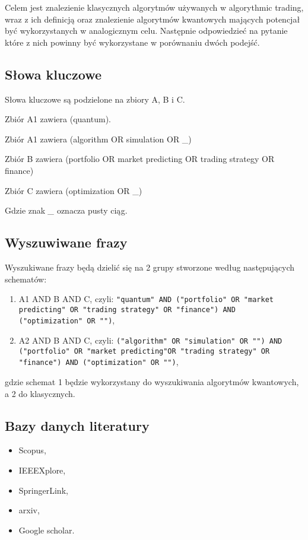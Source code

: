 \documentclass[polish,envcountsect,10pt]{article}
\begin{document}
Celem jest znalezienie klasycznych algorytmów używanych w algorythmic trading, wraz z ich definicją oraz znalezienie algorytmów kwantowych mających potencjał być wykorzystanych w analogicznym celu. 
Następnie odpowiedzieć na pytanie które z nich powinny być wykorzystane w porównaniu dwóch podejść. 

\subsection{Słowa kluczowe}
Słowa kluczowe są podzielone na zbiory A, B i C.

Zbiór A1 zawiera (quantum).

Zbiór A1 zawiera (algorithm OR simulation OR \_)

Zbiór B zawiera (portfolio OR market predicting OR trading strategy OR finance)

Zbiór C zawiera (optimization OR \_)

Gdzie znak \emph{\_} oznacza pusty ciąg.

\subsection{Wyszuwiwane frazy}
Wyszukiwane frazy będą dzielić się na 2 grupy stworzone według następujących schematów:
\begin{enumerate}
	\item A1 AND B AND C, czyli: \newline \texttt{"quantum"\ AND ("portfolio"\ OR "market predicting"\ OR "trading strategy"\ OR \linebreak"finance")\ AND ("optimization"\ OR "")},
	\item A2 AND B AND C, czyli: \newline \texttt{("algorithm"\ OR "simulation"\ OR "")\ AND ("portfolio"\ OR "market predicting"\linebreak OR "trading strategy"\ OR "finance")\ AND ("optimization"\ OR "")},
\end{enumerate} 
gdzie schemat 1 będzie wykorzystany do wyszukiwania algorytmów kwantowych, a 2 do klasycznych. 

\subsection{Bazy danych literatury}

\begin{itemize}
	\item Scopus,
	\item IEEEXplore,
	\item SpringerLink,
	\item arxiv,
	\item Google scholar.
\end{itemize}
\end{document}
